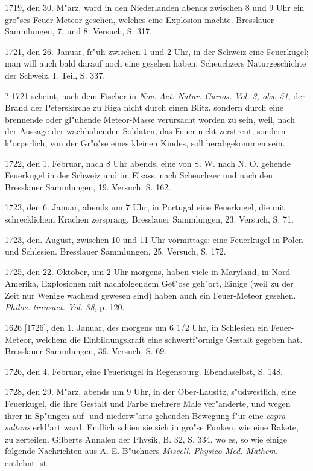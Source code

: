 \documentclass[a4paper, 11pt, oneside, polutonikogreek, german]{article}
\begin{document}
1719, den 30. M"arz, ward in den Niederlanden abends zwischen 8 und 9 Uhr ein gro"ses Feuer-Meteor gesehen, welches eine Explosion machte. Bresslauer Sammlungen, 7. und 8. Versuch, S. 317.

1721, den 26. Januar, fr"uh zwischen 1 und 2 Uhr, in der Schweiz eine Feuerkugel; man will auch bald darauf noch eine gesehen haben. Scheuchzers Naturgeschichte der Schweiz, I. Teil, S. 337.

? 1721 scheint, nach dem Fischer in \emph{Nov. Act. Natur. Curios. Vol. 3, obs. 51}, der Brand der Peterskirche zu Riga nicht durch einen Blitz, sondern durch eine brennende oder gl"uhende Meteor-Masse verursacht worden zu sein, weil, nach der Aussage der wachhabenden Soldaten, das Feuer nicht zerstreut, sondern k"orperlich, von der Gr"o"se eines kleinen Kindes, soll herabgekommen sein.

1722, den 1. Februar, nach 8 Uhr abends, eine von S. W. nach N. O. gehende Feuerkugel in der Schweiz und im Elsass, nach Scheuchzer und nach den Bresslauer Sammlungen, 19. Versuch, S. 162.

1723, den 6. Januar, abends um 7 Uhr, in Portugal eine Feuerkugel, die mit schrecklichem Krachen zersprang. Bresslauer Sammlungen, 23. Versuch, S. 71.

1723, den. August, zwischen 10 und 11 Uhr vormittags: eine Feuerkugel in Polen und Schlesien. Bresslauer Sammlungen, 25. Versuch, S. 172.

1725, den 22. Oktober, um 2 Uhr morgens, haben viele in Maryland, in Nord-Amerika, Explosionen mit nachfolgendem Get"ose geh"ort, Einige (weil zu der Zeit nur Wenige wachend gewesen sind) haben auch ein Feuer-Meteor gesehen. \emph{Philos. transact. Vol. 38}, p. 120.

1626 [1726], den 1. Januar, des morgens um 6 1/2 Uhr, in Schlesien ein Feuer-Meteor, welchem die Einbildungskraft eine schwertf"ormige Gestalt gegeben hat. Bresslauer Sammlungen, 39. Versuch, S. 69.

1726, den 4. Februar, eine Feuerkugel in Regensburg. Ebendaselbst, S. 148.

1728, den 29. M"arz, abends um 9 Uhr, in der Ober-Lausitz, s"udwestlich, eine Feuerkugel, die ihre Gestalt und Farbe mehrere Male ver"anderte, und wegen ihrer in Sp"ungen auf- und niederw"arts gehenden Bewegung f"ur eine \emph{capra saltans} erkl"art ward. Endlich schien sie sich in gro"se Funken, wie eine Rakete, zu zerteilen. Gilberts Annalen der Physik, B. 32, S. 334, wo es, so wie einige folgende Nachrichten aus A. E. B"uchners \emph{Miscell. Physico-Med. Mathem.} entlehnt ist.
\end{document}
